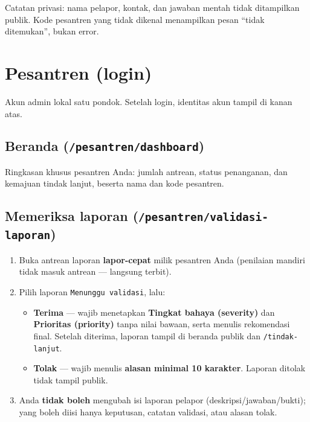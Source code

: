 \documentclass[11pt,a4paper]{article}
\newcommand{\code}[1]{\texttt{#1}}
\begin{document}
\noindent Catatan privasi: nama pelapor, kontak, dan jawaban mentah tidak
ditampilkan publik. Kode pesantren yang tidak dikenal menampilkan pesan ``tidak
ditemukan'', bukan error.

\section{Pesantren (login)}

Akun admin lokal satu pondok. Setelah login, identitas akun tampil di kanan atas.

\subsection{Beranda (\code{/pesantren/dashboard})}
Ringkasan khusus pesantren Anda: jumlah antrean, status penanganan, dan kemajuan
tindak lanjut, beserta nama dan kode pesantren.

\subsection{Memeriksa laporan (\code{/pesantren/validasi-laporan})}
\begin{enumerate}
  \item Buka antrean laporan \textbf{lapor-cepat} milik pesantren Anda (penilaian
        mandiri tidak masuk antrean --- langsung terbit).
  \item Pilih laporan \code{Menunggu validasi}, lalu:
        \begin{itemize}
          \item \textbf{Terima} --- wajib menetapkan \textbf{Tingkat bahaya
                (severity)} dan \textbf{Prioritas (priority)} tanpa nilai bawaan,
                serta menulis rekomendasi final. Setelah diterima, laporan tampil di
                beranda publik dan \code{/tindak-lanjut}.
          \item \textbf{Tolak} --- wajib menulis \textbf{alasan minimal 10 karakter}.
                Laporan ditolak tidak tampil publik.
        \end{itemize}
  \item Anda \textbf{tidak boleh} mengubah isi laporan pelapor
        (deskripsi/jawaban/bukti); yang boleh diisi hanya keputusan, catatan
        validasi, atau alasan tolak.
\end{enumerate}
\end{document}
